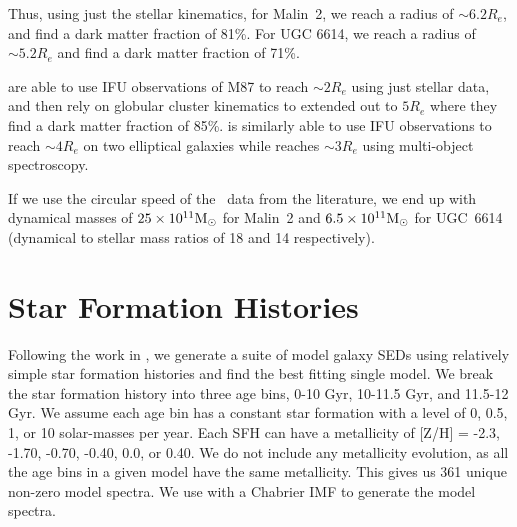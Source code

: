 \documentclass{emulateapj}
\def\arcsec{$^{\prime\prime}$}
\newcommand\msun{\rm{M}_\odot}
\newcommand\HI{\ion{H}{1}}
\begin{document}
Thus, using just the stellar kinematics, for Malin~2, we reach a radius of $\sim 6.2 R_e$, and find a dark matter fraction of 81\%.  For UGC 6614, we reach a radius of  $\sim 5.2 R_e$ and find a dark matter fraction of 71\%.  

\citet{Murphy2011} are able to use IFU observations of M87 to reach $\sim2 R_e$ using just stellar data, and then rely on globular cluster kinematics to extended out to $5 R_e$ where they find a dark matter fraction of 85\%.  \citet{Weij09} is similarly able to use IFU observations to reach $\sim 4 R_e$ on two elliptical galaxies while \citet{Proctor09} reaches $\sim 3 R_e$ using multi-object spectroscopy.  


If we use the circular speed of the \HI\ data from the literature, we end up with dynamical masses of $25\times 10^{11} \msun$ for Malin~2 and $6.5\times 10^{11} \msun$ for UGC~6614 (dynamical to stellar mass ratios of 18 and 14 respectively).   %








\section{Star Formation Histories}

Following the work in \citet{Yoachim10,Yoachim12}, we generate a suite of model galaxy SEDs using relatively simple star formation histories and find the best fitting single model.  We break the star formation history into three age bins, 0-10 Gyr, 10-11.5 Gyr, and 11.5-12 Gyr.  We assume each age bin has a constant star formation with a level of 0, 0.5, 1, or 10 solar-masses per year.  Each SFH can have a metallicity of [Z/H] = -2.3, -1.70, -0.70, -0.40, 0.0, or 0.40.  We do not include any metallicity evolution, as all the age bins in a given model have the same metallicity.  This gives us 361 unique non-zero model spectra. We use \citet{Bruzual03} with a Chabrier IMF to generate the model spectra. 
  
\end{document}
